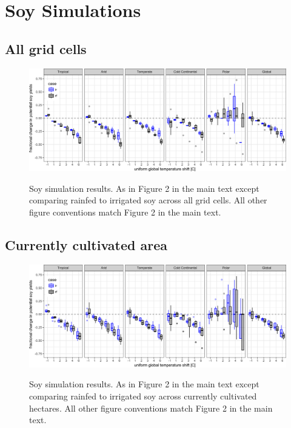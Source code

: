\documentclass[10pt]{article}
\begin{document}
\clearpage
\section{Soy Simulations}
\subsection{All grid cells}
\begin{figure}[h!]
\includegraphics[width=\textwidth]{s_soy_sim_CG.png}\\
\caption{Soy simulation results. As in Figure 2 in the main text except comparing rainfed to irrigated soy across all grid cells. All other figure conventions match Figure 2 in the main text.}
\label{fig:maizeCG}
\end{figure}

\subsection{Currently cultivated area}
\begin{figure}[h!]
\includegraphics[width=\textwidth]{s_soy_sim_CG_area_weight.png}\\
\caption{Soy simulation results. As in Figure 2 in the main text except comparing rainfed to irrigated soy across currently cultivated hectares. All other figure conventions match Figure 2 in the main text.}
\label{fig:maizeCG}
\end{figure}
\end{document}
